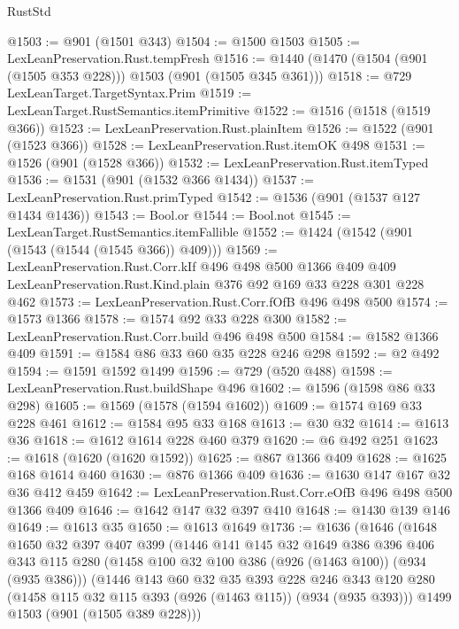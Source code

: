 \begin{lexlean}{RustStd}
\begin{coremodule}
@1503 := @901 (@1501 @343)
@1504 := @1500 @1503
@1505 := LexLeanPreservation.Rust.tempFresh
@1516 := @1440 (@1470 (@1504 (@901 (@1505 @353 @228))) @1503 (@901 (@1505 @345 @361)))
@1518 := @729 LexLeanTarget.TargetSyntax.Prim
@1519 := LexLeanTarget.RustSemantics.itemPrimitive
@1522 := @1516 (@1518 (@1519 @366))
@1523 := LexLeanPreservation.Rust.plainItem
@1526 := @1522 (@901 (@1523 @366))
@1528 := LexLeanPreservation.Rust.itemOK @498
@1531 := @1526 (@901 (@1528 @366))
@1532 := LexLeanPreservation.Rust.itemTyped
@1536 := @1531 (@901 (@1532 @366 @1434))
@1537 := LexLeanPreservation.Rust.primTyped
@1542 := @1536 (@901 (@1537 @127 @1434 @1436))
@1543 := Bool.or
@1544 := Bool.not
@1545 := LexLeanTarget.RustSemantics.itemFallible
@1552 := @1424 (@1542 (@901 (@1543 (@1544 (@1545 @366)) @409)))
@1569 := LexLeanPreservation.Rust.Corr.kIf
    @496
    @498
    @500
    @1366
    @409
    @409
    LexLeanPreservation.Rust.Kind.plain
    @376
    @92
    @169
    @33
    @228
    @301
    @228
    @462
@1573 := LexLeanPreservation.Rust.Corr.fOfB @496 @498 @500
@1574 := @1573 @1366
@1578 := @1574 @92 @33 @228 @300
@1582 := LexLeanPreservation.Rust.Corr.build @496 @498 @500
@1584 := @1582 @1366 @409
@1591 := @1584 @86 @33 @60 @35 @228 @246 @298
@1592 := @2 @492
@1594 := @1591 @1592 @1499
@1596 := @729 (@520 @488)
@1598 := LexLeanPreservation.Rust.buildShape @496
@1602 := @1596 (@1598 @86 @33 @298)
@1605 := @1569 (@1578 (@1594 @1602))
@1609 := @1574 @169 @33 @228 @461
@1612 := @1584 @95 @33 @168
@1613 := @30 @32
@1614 := @1613 @36
@1618 := @1612 @1614 @228 @460 @379
@1620 := @6 @492 @251
@1623 := @1618 (@1620 (@1620 @1592))
@1625 := @867 @1366 @409
@1628 := @1625 @168 @1614 @460
@1630 := @876 @1366 @409
@1636 := @1630 @147 @167 @32 @36 @412 @459
@1642 := LexLeanPreservation.Rust.Corr.eOfB @496 @498 @500 @1366 @409
@1646 := @1642 @147 @32 @397 @410
@1648 := @1430 @139 @146
@1649 := @1613 @35
@1650 := @1613 @1649
@1736 := @1636
    (@1646
      (@1648
        @1650
        @32
        @397
        @407
        @399
        (@1446
          @141
          @145
          @32
          @1649
          @386
          @396
          @406
          @343
          @115
          @280
          (@1458 @100 @32 @100 @386 (@926 (@1463 @100)) (@934 (@935 @386)))
          (@1446
            @143
            @60
            @32
            @35
            @393
            @228
            @246
            @343
            @120
            @280
            (@1458 @115 @32 @115 @393 (@926 (@1463 @115)) (@934 (@935 @393)))
            @1499
            @1503
            (@901 (@1505 @389 @228)))

\end{coremodule}
\end{lexlean}
